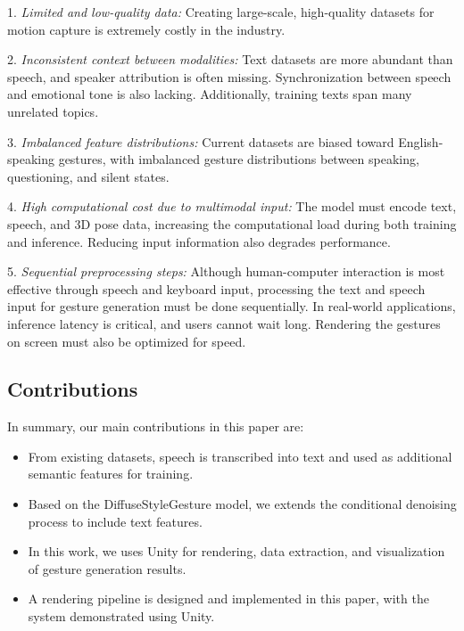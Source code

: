 1. \textit{Limited and low-quality data:} Creating large-scale, high-quality datasets for motion capture is extremely costly in the industry.

2. \textit{Inconsistent context between modalities:} Text datasets are more abundant than speech, and speaker attribution is often missing. Synchronization between speech and emotional tone is also lacking. Additionally, training texts span many unrelated topics.

3. \textit{Imbalanced feature distributions:} Current datasets are biased toward English-speaking gestures, with imbalanced gesture distributions between speaking, questioning, and silent states.

4. \textit{High computational cost due to multimodal input:} The model must encode text, speech, and 3D pose data, increasing the computational load during both training and inference. Reducing input information also degrades performance.

5. \textit{Sequential preprocessing steps:} Although human-computer interaction is most effective through speech and keyboard input, processing the text and speech input for gesture generation must be done sequentially. In real-world applications, inference latency is critical, and users cannot wait long. Rendering the gestures on screen must also be optimized for speed.

\subsection{Contributions}

 In summary, our main contributions in this paper are:
 
\begin{itemize}
	\item From existing datasets, speech is transcribed into text and used as additional semantic features for training.
	
	\item Based on the DiffuseStyleGesture model, we extends the conditional denoising process to include text features.
	
	\item In this work, we uses Unity for rendering, data extraction, and visualization of gesture generation results.
	
	\item A rendering pipeline is designed and implemented in this paper, with the system demonstrated using Unity.
\end{itemize}



